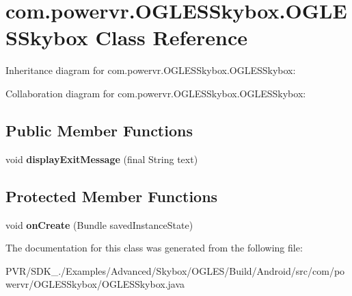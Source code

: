 \hypertarget{classcom_1_1powervr_1_1_o_g_l_e_s_skybox_1_1_o_g_l_e_s_skybox}{\section{com.\+powervr.\+O\+G\+L\+E\+S\+Skybox.\+O\+G\+L\+E\+S\+Skybox Class Reference}
\label{classcom_1_1powervr_1_1_o_g_l_e_s_skybox_1_1_o_g_l_e_s_skybox}
}


Inheritance diagram for com.\+powervr.\+O\+G\+L\+E\+S\+Skybox.\+O\+G\+L\+E\+S\+Skybox\+:


Collaboration diagram for com.\+powervr.\+O\+G\+L\+E\+S\+Skybox.\+O\+G\+L\+E\+S\+Skybox\+:
\subsection*{Public Member Functions}
\begin{DoxyCompactItemize}
\item 
\hypertarget{classcom_1_1powervr_1_1_o_g_l_e_s_skybox_1_1_o_g_l_e_s_skybox_aebb5298f787eb0d022cb52ce572bec9c}{void {\bfseries display\+Exit\+Message} (final String text)}\label{classcom_1_1powervr_1_1_o_g_l_e_s_skybox_1_1_o_g_l_e_s_skybox_aebb5298f787eb0d022cb52ce572bec9c}

\end{DoxyCompactItemize}
\subsection*{Protected Member Functions}
\begin{DoxyCompactItemize}
\item 
\hypertarget{classcom_1_1powervr_1_1_o_g_l_e_s_skybox_1_1_o_g_l_e_s_skybox_a2b467138df8fa9616d1ef53f2df0c654}{void {\bfseries on\+Create} (Bundle saved\+Instance\+State)}\label{classcom_1_1powervr_1_1_o_g_l_e_s_skybox_1_1_o_g_l_e_s_skybox_a2b467138df8fa9616d1ef53f2df0c654}

\end{DoxyCompactItemize}


The documentation for this class was generated from the following file\+:\begin{DoxyCompactItemize}
\item 
P\+V\+R/\+S\+D\+K\+\_./\+Examples/\+Advanced/\+Skybox/\+O\+G\+L\+E\+S/\+Build/\+Android/src/com/powervr/\+O\+G\+L\+E\+S\+Skybox/O\+G\+L\+E\+S\+Skybox.\+java\end{DoxyCompactItemize}
